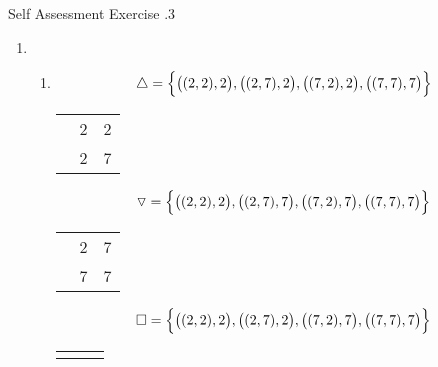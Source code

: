 \documentclass[\main/notes.tex]{subfiles}
\begin{document}
				\begin{exercise}{Self Assessment Exercise \thechapter.3}
					\begin{enumerate}
						\item {}
							\begin{enumerate}[label=(\alph*)]
								\item {}
									\begin{align*}
										\triangle = \Bigl\{\bigl((2, 2), 2\bigr), \bigl((2, 7), 2\bigr), \bigl((7, 2), 2\bigr), \bigl((7, 7), 7\bigr)\Bigr\}
									\end{align*}
									\begin{center}
										\begin{tabular}{|c | c c|}
											\hline
											\tablehead{$\triangle$} & \tablehead{$2$} & \tablehead{$7$}\\
											\hline
											\tablehead{$2$} & 2 & 2\\
											\tablehead{$7$} & 2 & 7\\
											\hline
										\end{tabular}
									\end{center}
									\begin{align*}
										\triangledown = \Bigl\{\bigl((2, 2), 2\bigr), \bigl((2, 7), 7\bigr), \bigl((7, 2), 7\bigr), \bigl((7, 7), 7\bigr)\Bigr\}
									\end{align*}
									\begin{center}
										\begin{tabular}{|c | c c|}
											\hline
											\tablehead{$\triangledown$} & \tablehead{$2$} & \tablehead{$7$}\\
											\hline
											\tablehead{$2$} & 2 & 7\\
											\tablehead{$7$} & 7 & 7\\
											\hline
										\end{tabular}
									\end{center}
									\begin{align*}
										\square = \Bigl\{\bigl((2, 2), 2\bigr), \bigl((2, 7), 2\bigr), \bigl((7, 2), 7\bigr), \bigl((7, 7), 7\bigr)\Bigr\}
									\end{align*}
									\begin{center}
										\begin{tabular}{|c | c c|}
											\hline
											\tablehead{$\square$} & \tablehead{$2$} & \tablehead{$7$}\\

\end{tabular}
\end{center}
\end{enumerate}
\end{enumerate}
\end{exercise}
\end{document}
